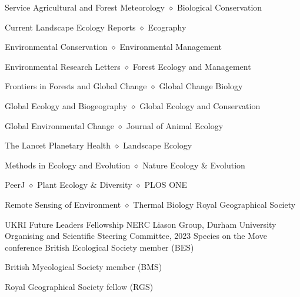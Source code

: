 
\begin{rubric}{Service}
	Agricultural and Forest Meteorology $\diamond$ Biological Conservation 
	\par Current Landscape Ecology Reports $\diamond$ Ecography 
	\par Environmental Conservation $\diamond$ Environmental Management
	\par Environmental Research Letters $\diamond$ Forest Ecology and Management
	\par Frontiers in Forests and Global Change $\diamond$ Global Change Biology
	\par Global Ecology and Biogeography $\diamond$ Global Ecology and Conservation
	\par Global Environmental Change $\diamond$ Journal of Animal Ecology
	\par The Lancet Planetary Health  $\diamond$ Landscape Ecology 
	\par Methods in Ecology and Evolution $\diamond$ Nature Ecology \& Evolution
	\par PeerJ $\diamond$ Plant Ecology \& Diversity $\diamond$ PLOS ONE
	\par Remote Sensing of Environment $\diamond$ Thermal Biology
	Royal Geographical Society
	\par UKRI Future Leaders Fellowship 
	NERC Liason Group, Durham University
	Organising and Scientific Steering Committee, 2023 Species on the Move conference 
	British Ecological Society member (BES)
	\par British Mycological Society member (BMS)
	\par Royal Geographical Society fellow (RGS)
\end{rubric}

